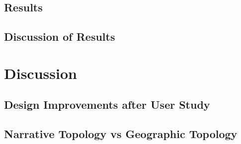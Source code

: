\documentclass[logo,msc]{infthesis}
\begin{document}
\section{Results}
%

\section{Discussion of Results}
%


\chapter{Discussion}

\section{Design Improvements after User Study}
%

\section{Narrative Topology vs Geographic Topology}
%
\end{document}
